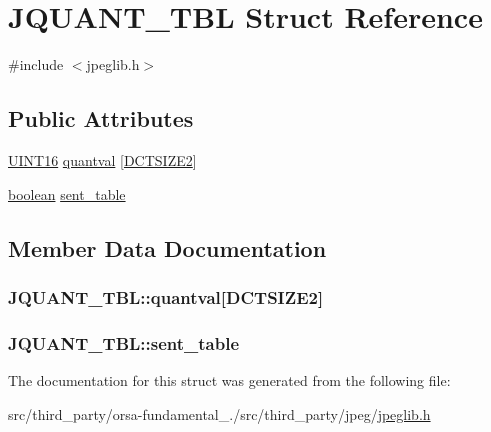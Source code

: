 \hypertarget{structJQUANT__TBL}{}\section{J\+Q\+U\+A\+N\+T\+\_\+\+T\+B\+L Struct Reference}
\label{structJQUANT__TBL}


{\ttfamily \#include $<$jpeglib.\+h$>$}

\subsection*{Public Attributes}
\begin{DoxyCompactItemize}
\item 
\hyperlink{jmorecfg_8h_a805c2c164bdd38d72a30c46e84fb568b}{U\+I\+N\+T16} \hyperlink{structJQUANT__TBL_ab5b5150e73282a62ca7dc0f7e2fac944}{quantval} \mbox{[}\hyperlink{jpeglib_8h_af89dff4200396563157d4a1e59da3bdf}{D\+C\+T\+S\+I\+Z\+E2}\mbox{]}
\item 
\hyperlink{jmorecfg_8h_a7c6368b321bd9acd0149b030bb8275ed}{boolean} \hyperlink{structJQUANT__TBL_a218b782157eccfbd22023ae6bb4cc7fa}{sent\+\_\+table}
\end{DoxyCompactItemize}


\subsection{Member Data Documentation}
\hypertarget{structJQUANT__TBL_ab5b5150e73282a62ca7dc0f7e2fac944}{}
\subsubsection[{quantval}]{ J\+Q\+U\+A\+N\+T\+\_\+\+T\+B\+L\+::quantval\mbox{[}{\bf D\+C\+T\+S\+I\+Z\+E2}\mbox{]}}\label{structJQUANT__TBL_ab5b5150e73282a62ca7dc0f7e2fac944}
\hypertarget{structJQUANT__TBL_a218b782157eccfbd22023ae6bb4cc7fa}{}
\subsubsection[{sent\+\_\+table}]{ J\+Q\+U\+A\+N\+T\+\_\+\+T\+B\+L\+::sent\+\_\+table}\label{structJQUANT__TBL_a218b782157eccfbd22023ae6bb4cc7fa}


The documentation for this struct was generated from the following file\+:\begin{DoxyCompactItemize}
\item 
src/third\+\_\+party/orsa-\/fundamental\+\_./src/third\+\_\+party/jpeg/\hyperlink{jpeglib_8h}{jpeglib.\+h}\end{DoxyCompactItemize}
